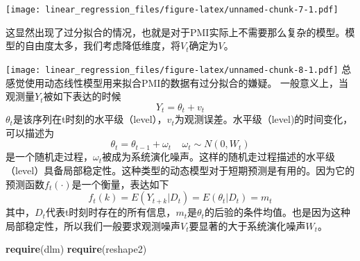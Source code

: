 \documentclass[]{ctexart}
\newenvironment{Shaded}{\begin{snugshade}}{\end{snugshade}}
\newcommand{\KeywordTok}[1]{\textcolor[rgb]{0.13,0.29,0.53}{\textbf{{#1}}}}
\newcommand{\DataTypeTok}[1]{\textcolor[rgb]{0.13,0.29,0.53}{{#1}}}
\newcommand{\DecValTok}[1]{\textcolor[rgb]{0.00,0.00,0.81}{{#1}}}
\newcommand{\FloatTok}[1]{\textcolor[rgb]{0.00,0.00,0.81}{{#1}}}
\newcommand{\StringTok}[1]{\textcolor[rgb]{0.31,0.60,0.02}{{#1}}}
\newcommand{\OtherTok}[1]{\textcolor[rgb]{0.56,0.35,0.01}{{#1}}}
\newcommand{\NormalTok}[1]{{#1}}
\begin{document}
\texttt{[image: linear\_regression\_files/figure-latex/unnamed-chunk-7-1.pdf]}

这显然出现了过分拟合的情况，也就是对于PMI实际上不需要那么复杂的模型。模型的自由度太多，我们考虑降低维度，将\(V_t\)确定为\(V\)。

\begin{Shaded}
\end{Shaded}

\texttt{[image: linear\_regression\_files/figure-latex/unnamed-chunk-8-1.pdf]}
总感觉使用动态线性模型用来拟合PMI的数据有过分拟合的嫌疑。
一般意义上，当观测量\(Y_t\)被如下表达的时候 \[
Y_t=\theta_t + v_t
\]
\(\theta_t\)是该序列在t时刻的水平级（level），\(v_t\)为观测误差。水平级（level)的时间变化，可以描述为
\[
\theta_t = \theta_{t-1}+\omega_t\ \ \ \ \ \omega_t\sim N(0,W_t)
\]
是一个随机走过程，\(\omega_t\)被成为系统演化噪声。这样的随机走过程描述的水平级（level）具备局部稳定性。这种类型的动态模型对于短期预测是有用的。因为它的预测函数\(f_t(\cdot)\)是一个衡量，表达如下
\[
f_t(k)=E(Y_{t+k}|D_t)=E(\theta_t|D_t)=m_t
\]
其中，\(D_t\)代表t时刻时存在的所有信息，\(m_t\)是\(\theta_t\)的后验的条件均值。也是因为这种局部稳定性，所以我们一般要求观测噪声\(V_t\)要显著的大于系统演化噪声\(W_t\)。

\begin{Shaded}
\begin{Highlighting}[]
\KeywordTok{require}\NormalTok{(dlm)}
\KeywordTok{require}\NormalTok{(reshape2)}
\end{Highlighting}
\end{Shaded}
\end{document}

